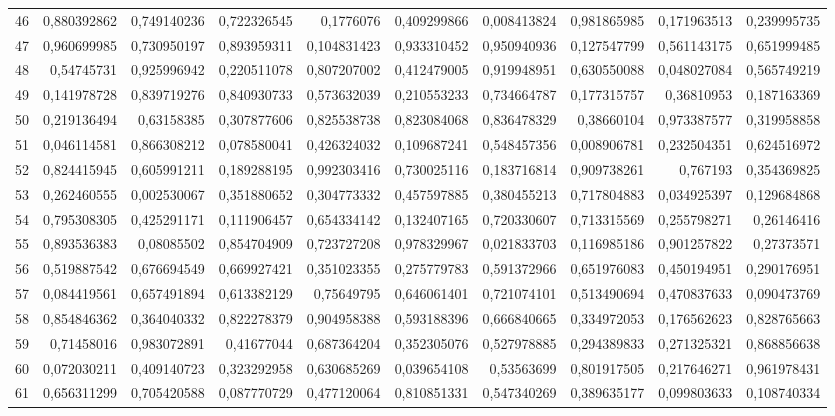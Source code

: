 \documentclass{article}
\begin{document}
\begin{landscape}
\begin{longtable}{lrrrrrrrrr}
46	&	0,880392862	&	0,749140236	&	0,722326545	&	0,1776076	&	0,409299866	&	0,008413824	&	0,981865985	&	0,171963513	&	0,239995735	\\
47	&	0,960699985	&	0,730950197	&	0,893959311	&	0,104831423	&	0,933310452	&	0,950940936	&	0,127547799	&	0,561143175	&	0,651999485	\\
48	&	0,54745731	&	0,925996942	&	0,220511078	&	0,807207002	&	0,412479005	&	0,919948951	&	0,630550088	&	0,048027084	&	0,565749219	\\
49	&	0,141978728	&	0,839719276	&	0,840930733	&	0,573632039	&	0,210553233	&	0,734664787	&	0,177315757	&	0,36810953	&	0,187163369	\\
50	&	0,219136494	&	0,63158385	&	0,307877606	&	0,825538738	&	0,823084068	&	0,836478329	&	0,38660104	&	0,973387577	&	0,319958858	\\
51	&	0,046114581	&	0,866308212	&	0,078580041	&	0,426324032	&	0,109687241	&	0,548457356	&	0,008906781	&	0,232504351	&	0,624516972	\\
52	&	0,824415945	&	0,605991211	&	0,189288195	&	0,992303416	&	0,730025116	&	0,183716814	&	0,909738261	&	0,767193	&	0,354369825	\\
53	&	0,262460555	&	0,002530067	&	0,351880652	&	0,304773332	&	0,457597885	&	0,380455213	&	0,717804883	&	0,034925397	&	0,129684868	\\
54	&	0,795308305	&	0,425291171	&	0,111906457	&	0,654334142	&	0,132407165	&	0,720330607	&	0,713315569	&	0,255798271	&	0,26146416	\\
55	&	0,893536383	&	0,08085502	&	0,854704909	&	0,723727208	&	0,978329967	&	0,021833703	&	0,116985186	&	0,901257822	&	0,27373571	\\
56	&	0,519887542	&	0,676694549	&	0,669927421	&	0,351023355	&	0,275779783	&	0,591372966	&	0,651976083	&	0,450194951	&	0,290176951	\\
57	&	0,084419561	&	0,657491894	&	0,613382129	&	0,75649795	&	0,646061401	&	0,721074101	&	0,513490694	&	0,470837633	&	0,090473769	\\
58	&	0,854846362	&	0,364040332	&	0,822278379	&	0,904958388	&	0,593188396	&	0,666840665	&	0,334972053	&	0,176562623	&	0,828765663	\\
59	&	0,71458016	&	0,983072891	&	0,41677044	&	0,687364204	&	0,352305076	&	0,527978885	&	0,294389833	&	0,271325321	&	0,868856638	\\
60	&	0,072030211	&	0,409140723	&	0,323292958	&	0,630685269	&	0,039654108	&	0,53563699	&	0,801917505	&	0,217646271	&	0,961978431	\\
61	&	0,656311299	&	0,705420588	&	0,087770729	&	0,477120064	&	0,810851331	&	0,547340269	&	0,389635177	&	0,099803633	&	0,108740334	\\

\end{longtable}
\end{landscape}
\end{document}
